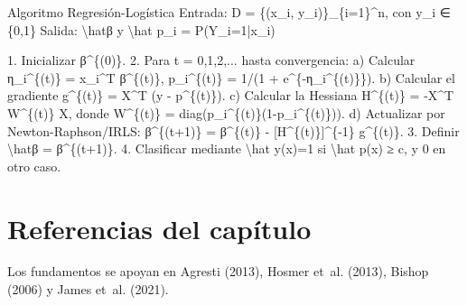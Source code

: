 \documentclass[
  spanish,
  10.5pt,
  letterpaper,
  DIV=11,
  numbers=noendperiod,
  oneside,
  open=any]{scrreprt}
\newenvironment{Shaded}{\begin{snugshade}}{\end{snugshade}}
\newcommand{\NormalTok}[1]{\textcolor[rgb]{0.00,0.23,0.31}{#1}}
\theoremstyle{definition}
\theoremstyle{definition}
\theoremstyle{plain}
\theoremstyle{remark}
\begin{document}
\begin{tcolorbox}[enhanced jigsaw, arc=.35mm, bottomrule=.15mm, bottomtitle=1mm, breakable, colback=white, colbacktitle=quarto-callout-note-color!10!white, colframe=quarto-callout-note-color-frame, coltitle=black, left=2mm, leftrule=.75mm, opacityback=0, opacitybacktitle=0.6, rightrule=.15mm, title=\textcolor{quarto-callout-note-color}{\faInfo}\hspace{0.5em}{Seudocódigo matemático formal}, titlerule=0mm, toprule=.15mm, toptitle=1mm]

\begin{Shaded}
\begin{Highlighting}[numbers=left,,]
\NormalTok{Algoritmo Regresión{-}Logística}
\NormalTok{Entrada:}
\NormalTok{  D = \{(x\_i, y\_i)\}\_\{i=1\}\^{}n, con y\_i ∈ \{0,1\}}
\NormalTok{Salida:}
\NormalTok{  \textbackslash{}hatβ y \textbackslash{}hat p\_i = P(Y\_i=1|x\_i)}

\NormalTok{1. Inicializar β\^{}\{(0)\}.}
\NormalTok{2. Para t = 0,1,2,... hasta convergencia:}
\NormalTok{   a) Calcular}
\NormalTok{         η\_i\^{}\{(t)\} = x\_i\^{}T β\^{}\{(t)\},}
\NormalTok{         p\_i\^{}\{(t)\} = 1/(1 + e\^{}\{{-}η\_i\^{}\{(t)\}\}).}
\NormalTok{   b) Calcular el gradiente}
\NormalTok{         g\^{}\{(t)\} = X\^{}T (y {-} p\^{}\{(t)\}).}
\NormalTok{   c) Calcular la Hessiana}
\NormalTok{         H\^{}\{(t)\} = {-}X\^{}T W\^{}\{(t)\} X,}
\NormalTok{      donde W\^{}\{(t)\} = diag(p\_i\^{}\{(t)\}(1{-}p\_i\^{}\{(t)\})).}
\NormalTok{   d) Actualizar por Newton{-}Raphson/IRLS:}
\NormalTok{         β\^{}\{(t+1)\} = β\^{}\{(t)\} {-} [H\^{}\{(t)\}]\^{}\{{-}1\} g\^{}\{(t)\}.}
\NormalTok{3. Definir \textbackslash{}hatβ = β\^{}\{(t+1)\}.}
\NormalTok{4. Clasificar mediante}
\NormalTok{      \textbackslash{}hat y(x)=1 si \textbackslash{}hat p(x) ≥ c, y 0 en otro caso.}
\end{Highlighting}
\end{Shaded}

\end{tcolorbox}

\section*{Referencias del
capítulo}\label{referencias-del-capuxedtulo-10}


Los fundamentos se apoyan en Agresti (2013), Hosmer et~al. (2013),
Bishop (2006) y James et~al. (2021).
\end{document}
